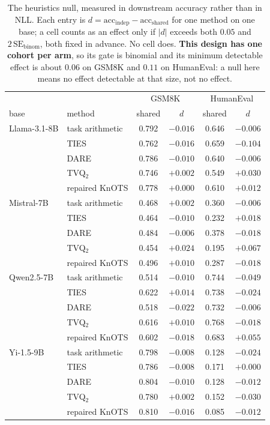 \begin{table}[t]
\centering
\small
\caption{The heuristics null, measured in downstream accuracy rather than in
NLL. Each entry is $d = \mathrm{acc}_{\mathrm{indep}} -
\mathrm{acc}_{\mathrm{shared}}$ for one method on one base; a cell counts as an
effect only if $|d|$ exceeds both $0.05$ and $2\,\mathrm{SE}_{\mathrm{binom}}$,
both fixed in advance. No cell does. \textbf{This design has one cohort per
arm}, so its gate is binomial and its minimum detectable effect is about
$0.06$ on GSM8K and $0.11$ on HumanEval: a null here means no effect detectable
at that size, not no effect.}
\label{tab:heur-downstream}
\begin{tabular}{llcccc}
\toprule
 & & \multicolumn{2}{c}{GSM8K} & \multicolumn{2}{c}{HumanEval} \\
base & method & shared & $d$ & shared & $d$ \\
\midrule
Llama-3.1-8B & task arithmetic & 0.792 & $-0.016$ & 0.646 & $-0.006$ \\
 & TIES & 0.762 & $-0.016$ & 0.659 & $-0.104$ \\
 & DARE & 0.786 & $-0.010$ & 0.640 & $-0.006$ \\
 & TVQ$_2$ & 0.746 & $+0.002$ & 0.549 & $+0.030$ \\
 & repaired KnOTS & 0.778 & $+0.000$ & 0.610 & $+0.012$ \\
\addlinespace
Mistral-7B & task arithmetic & 0.468 & $+0.002$ & 0.360 & $-0.006$ \\
 & TIES & 0.464 & $-0.010$ & 0.232 & $+0.018$ \\
 & DARE & 0.484 & $-0.006$ & 0.378 & $-0.018$ \\
 & TVQ$_2$ & 0.454 & $+0.024$ & 0.195 & $+0.067$ \\
 & repaired KnOTS & 0.496 & $+0.010$ & 0.287 & $-0.018$ \\
\addlinespace
Qwen2.5-7B & task arithmetic & 0.514 & $-0.010$ & 0.744 & $-0.049$ \\
 & TIES & 0.622 & $+0.014$ & 0.738 & $-0.024$ \\
 & DARE & 0.518 & $-0.022$ & 0.732 & $-0.006$ \\
 & TVQ$_2$ & 0.616 & $+0.010$ & 0.768 & $-0.018$ \\
 & repaired KnOTS & 0.602 & $-0.018$ & 0.683 & $+0.055$ \\
\addlinespace
Yi-1.5-9B & task arithmetic & 0.798 & $-0.008$ & 0.128 & $-0.024$ \\
 & TIES & 0.786 & $-0.008$ & 0.171 & $+0.000$ \\
 & DARE & 0.804 & $-0.010$ & 0.128 & $-0.012$ \\
 & TVQ$_2$ & 0.780 & $+0.002$ & 0.152 & $-0.030$ \\
 & repaired KnOTS & 0.810 & $-0.016$ & 0.085 & $-0.012$ \\
\bottomrule
\end{tabular}
\end{table}

